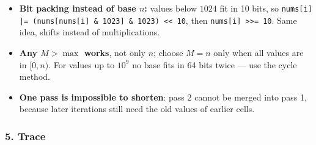 \begin{alternativebox}
\begin{diagrambox}
\end{diagrambox}
\end{alternativebox}

\begin{tricksbox}
\begin{itemize}[leftmargin=*]
    \item \textbf{Bit packing instead of base $n$:} values below $1024$ fit in 10 bits, so \texttt{nums[i] |= (nums[nums[i] \& 1023] \& 1023) << 10}, then \texttt{nums[i] >>= 10}. Same idea, shifts instead of multiplications.
    \item \textbf{Any $M > \max$ works}, not only $n$; choose $M = n$ only when all values are in $[0, n)$. For values up to $10^9$ no base fits in 64 bits twice --- use the cycle method.
    \item \textbf{One pass is impossible to shorten}: pass 2 cannot be merged into pass 1, because later iterations still need the old values of earlier cells.
\end{itemize}
\end{tricksbox}

\subsubsection*{5. Trace}

